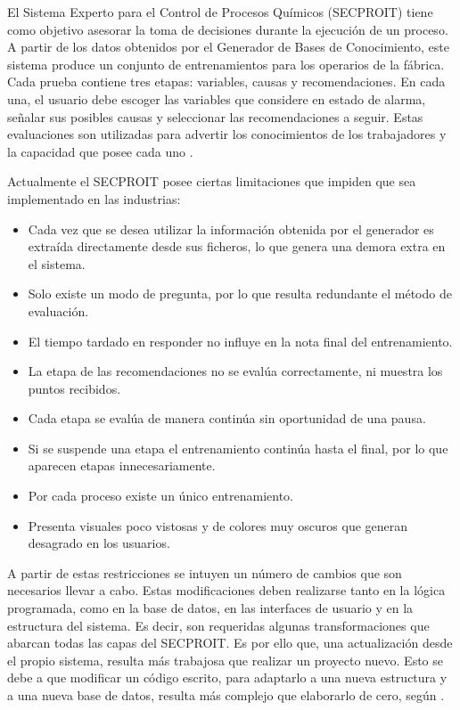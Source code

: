 El Sistema Experto para el Control de Procesos Químicos (SECPROIT) tiene como objetivo asesorar la toma de decisiones durante la ejecución de un proceso. A partir de los datos obtenidos por el Generador de Bases de Conocimiento, este sistema produce un conjunto de entrenamientos para los operarios de la fábrica. Cada prueba contiene tres etapas: variables, causas y recomendaciones. En cada una, el usuario debe escoger las variables que considere en estado de alarma, señalar sus posibles causas y seleccionar las recomendaciones a seguir. Estas evaluaciones son utilizadas para advertir los conocimientos de los trabajadores y la capacidad que posee cada uno \cite{elena}.

Actualmente el SECPROIT posee ciertas limitaciones que impiden que sea implementado en las industrias:
\begin{itemize}
\item Cada vez que se desea utilizar la información obtenida por el generador es extraída directamente desde sus ficheros, lo que genera una demora extra en el sistema.
\item Solo existe un modo de pregunta, por lo que resulta redundante el método de evaluación.
\item El tiempo tardado en responder no influye en la nota final del entrenamiento.
\item La etapa de las recomendaciones no se evalúa correctamente, ni muestra los puntos recibidos.
\item Cada etapa se evalúa de manera continúa sin oportunidad de una pausa.
\item Si se suspende una etapa el entrenamiento continúa hasta el final, por lo que aparecen etapas innecesariamente.
\item Por cada proceso existe un único entrenamiento.
\item Presenta visuales poco vistosas y de colores muy oscuros que generan desagrado en los usuarios.
\end{itemize}

A partir de estas restricciones se intuyen un número de cambios que son necesarios llevar a cabo. Estas modificaciones deben realizarse tanto en la lógica programada, como en la base de datos, en las interfaces de usuario y en la estructura del sistema. Es decir, son requeridas algunas transformaciones que abarcan todas las capas del SECPROIT.
Es por ello que, una actualización desde el propio sistema, resulta más trabajosa que realizar un proyecto nuevo. Esto se debe a que modificar un código escrito, para adaptarlo a una nueva estructura y a una nueva base de datos, resulta más complejo que elaborarlo de cero, según \cite{Plecka2013}.

